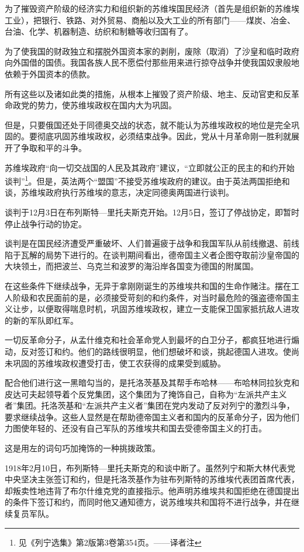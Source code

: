 为了摧毁资产阶级的经济实力和组织新的苏维埃国民经济（首先是组织新的苏维埃工业），把银行、铁路、对外贸易、商船以及大工业的所有部门——煤炭、冶金、台油、化学、机器制造、纺织和制糖等收归国有了。

为了使我国的财政独立和摆脱外国资本家的剥削，废除（取消）了沙皇和临时政府向外国借的国债。我国各族人民不愿偿付那些用来进行掠夺战争并使我国奴隶般地依赖于外国资本的债款。

所有这些以及诸如此类的措施，从根本上摧毁了资产阶级、地主、反动官吏和反革命政党的势力，使苏维埃政权在国内大为巩固。

但是，只要俄国还处于同德奥交战的状态，就不能认为苏维埃政权的地位是完全巩固的。要彻底巩固苏维埃政权，必须结束战争。因此，党从十月革命刚一胜利就展开了争取和平的斗争。

苏维埃政府“向一切交战国的人民及其政府”建议，“立即就公正的民主的和约开始谈判”\footnote{见《列宁选集》第2版第3卷第354页。——译者注}。但是，英法两个“盟国”不接受苏维埃政府的建议。由于英法两国拒绝和谈，苏维埃政府执行苏维埃的意志，决定同德奥两国进行谈判。

谈判于12月3日在布列斯特—里托夫斯克开始。12月5日，签订了停战协定，即暂时停止战争行动的协定。

谈判是在国民经济遭受严重破坏、人们普遍疲于战争和我国军队从前线撤退、前线陷于瓦解的局势下进行的。在谈判期间看出，德帝国主义者企图夺取前沙皇帝国的大块领土，而把波兰、乌克兰和波罗的海沿岸各国变为德国的附属国。

在这些条件下继续战争，无异于拿刚刚诞生的苏维埃共和国的生命作赌注。摆在工人阶级和农民面前的是，必须接受苛刻的和约条件，对当时最危险的强盗德帝国主义让步，以便取得喘息时机，巩固苏维埃政权，建立一支能保卫国家抵抗敌人进攻的新的军队即红军。

一切反革命分子，从孟什维克和社会革命党人到最坏的白卫分子，都疯狂地进行煽动，反对签订和约。他们的路线很明显，他们想破坏和谈，挑起德国人进攻。使尚未巩固的苏维埃政权遭受打击，使工农获得的成果受到威胁。

配合他们进行这一黑暗勾当的，是托洛茨基及其帮手布哈林——布哈林同拉狄克和皮达可夫起领导着个反党集团，这个集团为了掩饰自己，自称为“左派共产主义者”集团。托洛茨基和“左派共产主义者”集团在党内发动了反对列宁的激烈斗争，要求继续战争。这些人显然是在帮助德帝国主义者和国内的反革命分子，因为他们力图使年轻的、还没有自己军队的苏维埃共和国去受德帝国主义的打击。

这是用左的词句巧加掩饰的一种挑拨政策。

1918年2月10日，布列斯特—里托夫斯克的和谈中断了。虽然列宁和斯大林代表党中央坚决主张签订和约，但是托洛茨基作为驻布列斯特的苏维埃代表团首席代表，却叛卖性地违背了布尔什维克党的直接指示。他声明苏维埃共和国拒绝在德国提出的条件下签订和约，而同时他又通知德方，说苏维埃共和国将不进行战争，并在继续复员军队。

